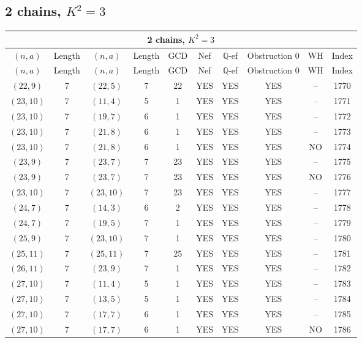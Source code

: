 \subsection{2 chains, $K^2 = 3$}
\begin{longtable}{|c|c|c|c|c|c|c|c|c|c|}
\hline
\multicolumn{10}{|c|}{2 chains, $K^2 = 3$}\\
\hline
$(n,a)$ & Length & $(n,a)$ & Length & GCD & Nef & $\mathbb Q$-ef & Obstruction 0 & WH & Index\\
\hline
\endfirsthead

\hline
$(n,a)$ & Length & $(n,a)$ & Length & GCD & Nef & $\mathbb Q$-ef & Obstruction 0 & WH & Index\\
\hline
\endhead
\hline
\endfoot

$(22, 9)$ & 7 & $(22, 5)$ & 7 & 22 & YES & YES & YES & -- & 1770\\
$(23, 10)$ & 7 & $(11, 4)$ & 5 & 1 & YES & YES & YES & -- & 1771\\
$(23, 10)$ & 7 & $(19, 7)$ & 6 & 1 & YES & YES & YES & -- & 1772\\
$(23, 10)$ & 7 & $(21, 8)$ & 6 & 1 & YES & YES & YES & -- & 1773\\
$(23, 10)$ & 7 & $(21, 8)$ & 6 & 1 & YES & YES & YES & NO & 1774\\
$(23, 9)$ & 7 & $(23, 7)$ & 7 & 23 & YES & YES & YES & -- & 1775\\
$(23, 9)$ & 7 & $(23, 7)$ & 7 & 23 & YES & YES & YES & NO & 1776\\
$(23, 10)$ & 7 & $(23, 10)$ & 7 & 23 & YES & YES & YES & -- & 1777\\
$(24, 7)$ & 7 & $(14, 3)$ & 6 & 2 & YES & YES & YES & -- & 1778\\
$(24, 7)$ & 7 & $(19, 5)$ & 7 & 1 & YES & YES & YES & -- & 1779\\
$(25, 9)$ & 7 & $(23, 10)$ & 7 & 1 & YES & YES & YES & -- & 1780\\
$(25, 11)$ & 7 & $(25, 11)$ & 7 & 25 & YES & YES & YES & -- & 1781\\
$(26, 11)$ & 7 & $(23, 9)$ & 7 & 1 & YES & YES & YES & -- & 1782\\
$(27, 10)$ & 7 & $(11, 4)$ & 5 & 1 & YES & YES & YES & -- & 1783\\
$(27, 10)$ & 7 & $(13, 5)$ & 5 & 1 & YES & YES & YES & -- & 1784\\
$(27, 10)$ & 7 & $(17, 7)$ & 6 & 1 & YES & YES & YES & -- & 1785\\
$(27, 10)$ & 7 & $(17, 7)$ & 6 & 1 & YES & YES & YES & NO & 1786\\

\end{longtable}
